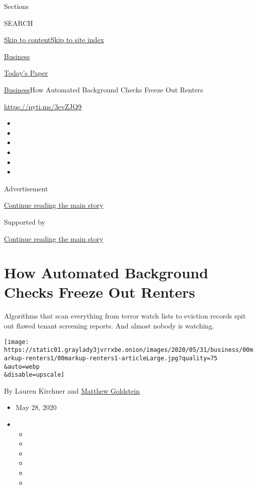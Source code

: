 Sections

SEARCH

\protect\hyperlink{site-content}{Skip to
content}\protect\hyperlink{site-index}{Skip to site index}

\href{https://www.nytimes3xbfgragh.onion/section/business}{Business}

\href{https://myaccount.nytimes3xbfgragh.onion/auth/login?response_type=cookie\&client_id=vi}{}

\href{https://www.nytimes3xbfgragh.onion/section/todayspaper}{Today's
Paper}

\href{/section/business}{Business}\textbar{}How Automated Background
Checks Freeze Out Renters

\href{https://nyti.ms/3evZJQ9}{https://nyti.ms/3evZJQ9}

\begin{itemize}
\item
\item
\item
\item
\item
\item
\end{itemize}

Advertisement

\protect\hyperlink{after-top}{Continue reading the main story}

Supported by

\protect\hyperlink{after-sponsor}{Continue reading the main story}

\hypertarget{how-automated-background-checks-freeze-out-renters}{%
\section{How Automated Background Checks Freeze Out
Renters}\label{how-automated-background-checks-freeze-out-renters}}

Algorithms that scan everything from terror watch lists to eviction
records spit out flawed tenant screening reports. And almost nobody is
watching.

\texttt{[image: https://static01.graylady3jvrrxbe.onion/images/2020/05/31/business/00markup-renters1/00markup-renters1-articleLarge.jpg?quality=75\\\&auto=webp\\\&disable=upscale]}

By Lauren Kirchner and
\href{https://www.nytimes3xbfgragh.onion/by/matthew-goldstein}{Matthew
Goldstein}

\begin{itemize}
\item
  May 28, 2020
\item
  \begin{itemize}
  \item
  \item
  \item
  \item
  \item
  \item
  \end{itemize}
\end{itemize}

